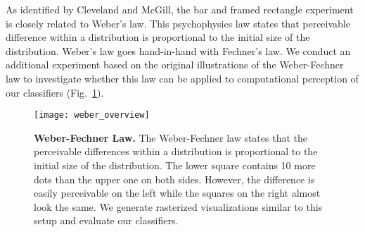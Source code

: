 As identified by Cleveland and McGill, the bar and framed rectangle experiment is closely related to Weber's law. This psychophysics law states that perceivable difference within a distribution is proportional to the initial size of the distribution. Weber's law goes hand-in-hand with Fechner's law. We conduct an additional experiment based on the original illustrations of the Weber-Fechner law to investigate whether this law can be applied to computational perception of our classifiers (Fig.~\ref{fig:webers_law}).

\begin{figure}[t]
	  \texttt{[image: weber\_overview]}
  \caption{\textbf{Weber-Fechner Law.} The Weber-Fechner law states that the perceivable differences within a distribution is proportional to the initial size of the distribution. The lower square contains 10 more dots than the upper one on both sides. However, the difference is easily perceivable on the left while the squares on the right almost look the same. We generate rasterized visualizations similar to this setup and evaluate our classifiers.}
	\label{fig:webers_law}
\end{figure}
